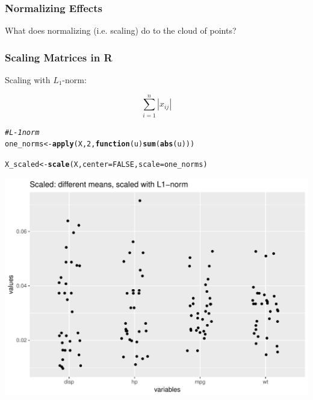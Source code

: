 \documentclass[12pt]{beamer}\usepackage[]{graphicx}\usepackage[]{color}
\makeatletter
\def\maxwidth{ %
  \ifdim\Gin@nat@width>\linewidth
    \linewidth
  \else
    \Gin@nat@width
  \fi
}
\newcommand{\hlnum}[1]{\textcolor[rgb]{0.686,0.059,0.569}{#1}}%
\newcommand{\hlcom}[1]{\textcolor[rgb]{0.678,0.584,0.686}{\textit{#1}}}%
\newcommand{\hlstd}[1]{\textcolor[rgb]{0.345,0.345,0.345}{#1}}%
\newcommand{\hlkwa}[1]{\textcolor[rgb]{0.161,0.373,0.58}{\textbf{#1}}}%
\newcommand{\hlkwb}[1]{\textcolor[rgb]{0.69,0.353,0.396}{#1}}%
\newcommand{\hlkwc}[1]{\textcolor[rgb]{0.333,0.667,0.333}{#1}}%
\newcommand{\hlkwd}[1]{\textcolor[rgb]{0.737,0.353,0.396}{\textbf{#1}}}%
\newenvironment{kframe}{%
 \def\at@end@of@kframe{}%
 \ifinner\ifhmode%
  \def\at@end@of@kframe{\end{minipage}}%
  \begin{minipage}{\columnwidth}%
 \fi\fi%
 \def\FrameCommand##1{\hskip\@totalleftmargin \hskip-\fboxsep
 \colorbox{shadecolor}{##1}\hskip-\fboxsep
     \hskip-\linewidth \hskip-\@totalleftmargin \hskip\columnwidth}%
 \MakeFramed {\advance\hsize-\width
   \@totalleftmargin\z@ \linewidth\hsize
   \@setminipage}}%
 {\par\unskip\endMakeFramed%
 \at@end@of@kframe}
\newenvironment{knitrout}{}{} %
\makeatother
\begin{document}

\begin{frame}
\frametitle{Normalizing Effects}

What does normalizing (i.e. scaling) do to the cloud of points?

\end{frame}


\begin{frame}[fragile]
\frametitle{Scaling Matrices in R}

Scaling with $L_1$-norm:

$$
\sum_{i=1}^{n} | x_{ij} |
$$

\begin{knitrout}\footnotesize
{}\color{fgcolor}\begin{kframe}
\begin{alltt}
\hlcom{# L-1 norm}
\hlstd{one_norms} \hlkwb{<-} \hlkwd{apply}\hlstd{(X,} \hlnum{2}\hlstd{,} \hlkwa{function}\hlstd{(}\hlkwc{u}\hlstd{)} \hlkwd{sum}\hlstd{(}\hlkwd{abs}\hlstd{(u)))}

\hlstd{X_scaled} \hlkwb{<-} \hlkwd{scale}\hlstd{(X,} \hlkwc{center} \hlstd{=} \hlnum{FALSE}\hlstd{,} \hlkwc{scale} \hlstd{= one_norms)}
\end{alltt}
\end{kframe}
\end{knitrout}

\end{frame}


\begin{frame}[fragile]



\begin{knitrout}\footnotesize
{}\color{fgcolor}

{\centering \includegraphics[width=\maxwidth]{figure/unnamed-chunk-15-1} 

}



\end{knitrout}

\end{frame}
\end{document}
